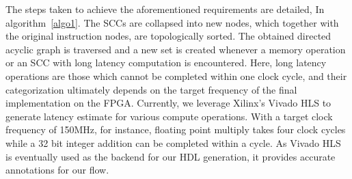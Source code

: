 \documentclass{sig-alternate}
\begin{document}
The steps taken to achieve the aforementioned requirements are detailed,
In algorithm~\ref{algo1}.
The SCCs are collapsed into new nodes, which together with the original instruction nodes, are topologically
sorted. The obtained directed acyclic graph is traversed and a new set is created whenever a memory operation
or an SCC with long latency computation
is encountered. Here, long latency operations are those which cannot be completed within
one clock cycle, and
their categorization ultimately depends on the target frequency
of the final implementation on the FPGA. Currently, we
leverage Xilinx's Vivado HLS to generate latency estimate for
various compute operations. With a target clock frequency of
150MHz, for instance, floating point multiply takes four clock
cycles while a 32 bit integer addition can be completed within
a cycle. As Vivado HLS is eventually used as the backend for
our HDL generation, it provides accurate annotations for our
flow.
\end{document}
